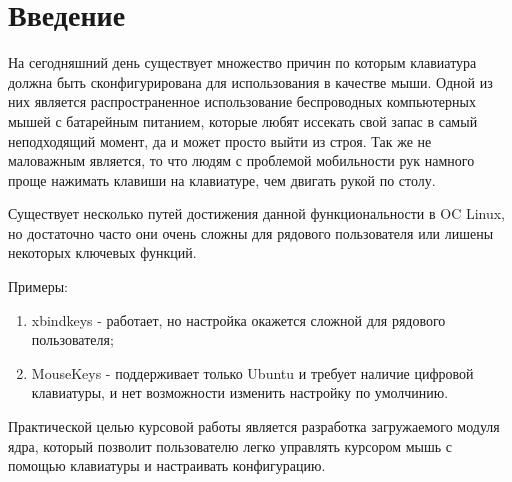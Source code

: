 \section*{Введение}
На сегодняшний день существует множество причин по которым клавиатура должна быть сконфигурирована для использования в качестве мыши.
Одной из них является распространенное использование беспроводных компьютерных мышей с батарейным питанием, которые любят иссекать свой запас в самый неподходящий момент, да и может просто выйти из строя.
Так же не маловажным является, то что людям с проблемой мобильности рук намного проще нажимать клавиши на клавиатуре, чем двигать рукой по столу.

Существует несколько путей достижения данной функциональности в OC Linux, но достаточно часто они очень сложны для рядового пользователя или лишены некоторых ключевых функций.

Примеры:
\begin{enumerate}
	\item xbindkeys - работает, но настройка окажется сложной для рядового пользователя;
	\item MouseKeys - поддерживает только Ubuntu и требует наличие цифровой клавиатуры, и нет возможности изменить настройку по умолчинию.
\end{enumerate}

Практической целью курсовой работы является разработка загружаемого модуля ядра, который позволит пользователю легко управлять курсором мышь с помощью клавиатуры и настраивать конфигурацию.

